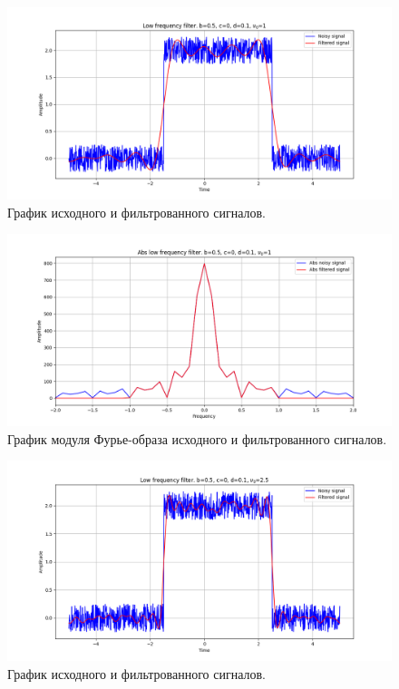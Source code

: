 \documentclass[a4paper, 12pt]{article}
\begin{document}
    \begin{figure}[!htb]
        \centering
        \includegraphics[scale=0.485]{12_u_flt_u_nohigh.png}
        \captionsetup{skip=0pt}
        \caption{График исходного и фильтрованного сигналов.}
        \label{fig:fig13}
    \end{figure}
    \begin{figure}[!htb]
        \centering
        \includegraphics[scale=0.485]{12_abs_u_U_nohigh.png}
        \captionsetup{skip=0pt}
        \caption{График модуля Фурье-образа исходного и фильтрованного сигналов.}
        \label{fig:fig14}
    \end{figure}
    \begin{figure}[!htb]
        \centering
        \includegraphics[scale=0.485]{13_u_flt_u_nohigh.png}
        \captionsetup{skip=0pt}
        \caption{График исходного и фильтрованного сигналов.}
        \label{fig:fig15}
    \end{figure}
\end{document}
